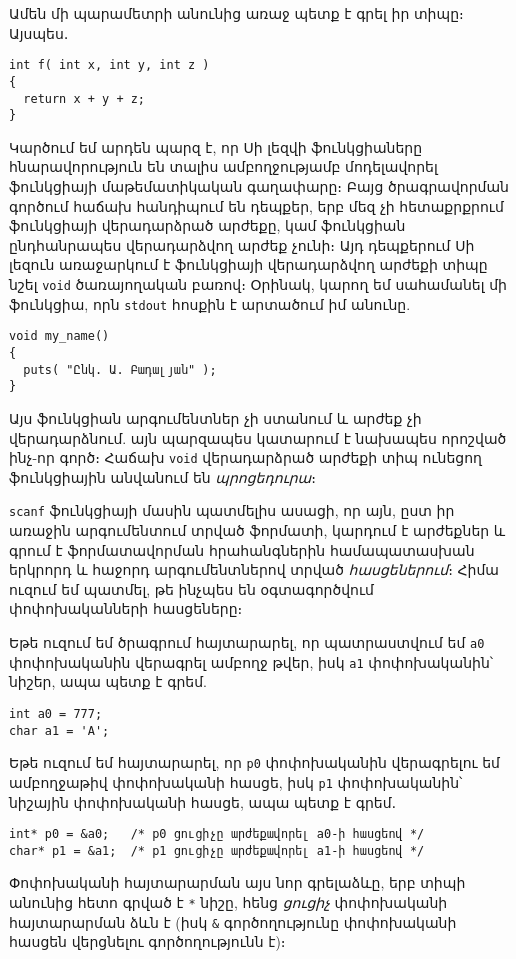 Ամեն մի պարամետրի անունից առաջ պետք է գրել իր տիպը։ Այսպես․

\begin{Verbatim}
int f( int x, int y, int z )
{
  return x + y + z;
}
\end{Verbatim}

Կարծում եմ արդեն պարզ է, որ Սի լեզվի ֆունկցիաները հնարավորություն են տալիս
ամբողջությամբ մոդելավորել ֆունկցիայի մաթեմատիկական գաղափարը։ Բայց ծրագրավորման
գործում հաճախ հանդիպում են դեպքեր, երբ մեզ չի հետաքրքրում ֆունկցիայի
վերադարձրած արժեքը, կամ ֆունկցիան ընդհանրապես վերադարձվող արժեք չունի։ Այդ
դեպքերում Սի լեզուն առաջարկում է ֆունկցիայի վերադարձվող արժեքի տիպը նշել
\texttt{void} ծառայողական բառով։ Օրինակ, կարող եմ սահամանել մի ֆունկցիա, որն
\texttt{stdout} հոսքին է արտածում իմ անունը.

\begin{Verbatim}
void my_name()
{
  puts( "Ընկ. Ա. Բադալյան" );
}
\end{Verbatim}

Այս ֆունկցիան արգումենտներ չի ստանում և արժեք չի վերադարձնում. այն պարզապես
կատարում է նախապես որոշված ինչ-որ գործ։ Հաճախ \texttt{void} վերադարձրած
արժեքի տիպ ունեցող ֆունկցիային անվանում են \emph{պրոցեդուրա}։


\texttt{scanf} ֆունկցիայի մասին պատմելիս ասացի, որ այն, ըստ իր առաջին
արգումենտում տրված ֆորմատի, կարդում է արժեքներ և գրում է ֆորմատավորման
հրահանգներին համապատասխան երկրորդ և հաջորդ արգումենտներով տրված
\emph{հասցեներում}։ Հիմա ուզում եմ պատմել, թե ինչպես են օգտագործվում
փոփոխականների հասցեները։

Եթե ուզում եմ ծրագրում հայտարարել, որ պատրաստվում եմ \texttt{a0} փոփոխականին
վերագրել ամբողջ թվեր, իսկ \texttt{a1} փոփոխականին՝ նիշեր, ապա պետք է գրեմ.

\begin{Verbatim}
int a0 = 777;
char a1 = 'A';
\end{Verbatim}

Եթե ուզում եմ հայտարարել, որ \texttt{p0} փոփոխականին վերագրելու եմ ամբողջաթիվ
փոփոխականի հասցե, իսկ \texttt{p1} փոփոխականին՝ նիշային փոփոխականի հասցե,
ապա պետք է գրեմ․

\begin{Verbatim}
int* p0 = &a0;   /* p0 ցուցիչը արժեքավորել a0-ի հասցեով */
char* p1 = &a1;  /* p1 ցուցիչը արժեքավորել a1-ի հասցեով */
\end{Verbatim}

Փոփոխականի հայտարարման այս նոր գրելաձևը, երբ տիպի անունից հետո գրված է
\verb|*| նիշը, հենց \emph{ցուցիչ} փոփոխականի հայտարարման ձևն է (իսկ \verb|&|
գործողությունը փոփոխականի հասցեն վերցնելու գործողությունն է)։

